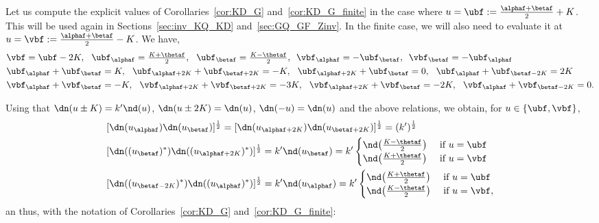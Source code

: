 \documentclass[a4paper,twoside,11pt]{article}
\begin{document}
\begin{exm}\label{ex:KD_u_v_special}
Let us compute the explicit values of Corollaries~\ref{cor:KD_G} and~\ref{cor:KD_G_finite} in the case where
$u=\ubf:=\frac{\alphaf+\betaf}{2}+K$. This will be used again in Sections~\ref{sec:inv_KQ_KD} and~\ref{sec:GQ_GF_Zinv}.
In the finite case, we will also need to evaluate it at $u=\vbf:=\frac{\alphaf+\betaf}{2}-K$. We have,
\begin{align}
&\textstyle \vbf=\ubf-2K,\ \ \ubf_{\alphaf}=\frac{K+\thetaf}{2},\ \ \ubf_{\betaf}=\frac{K-\thetaf}{2},\ \,\vbf_{\alphaf}=-\ubf_{\betaf},\ \,\vbf_{\betaf}
=-\ubf_{\alphaf}\nonumber\\
&\ubf_{\alphaf}+\ubf_{\betaf}=K,\ \ \ubf_{\alphaf+2K}+\ubf_{\betaf+2K}=-K,\ \
\ubf_{\alphaf+2K}+\ubf_{\betaf}=0,\ \ \ubf_{\alphaf}+\ubf_{\betaf-2K}=2K \label{equ:relation_u_v}\\
&\vbf_{\alphaf}+\vbf_{\betaf}=-K,\ \ \vbf_{\alphaf+2K}+\vbf_{\betaf+2K}=-3K,\ \
\vbf_{\alphaf+2K}+\vbf_{\betaf}=-2K,\ \ \vbf_{\alphaf}+\vbf_{\betaf-2K}=0.\nonumber
\end{align}

Using that $\dn(u\pm K)=k'\nd(u)$, $\dn(u\pm 2K)=\dn(u)$, $\dn(-u)=\dn(u)$ and the above relations, we obtain, for $u\in\{\ubf,\vbf\}$,
\begin{align*}
&[\dn(u_{\alphaf})\dn(u_{\betaf})]^\frac{1}{2}=[\dn(u_{\alphaf+2K})\dn(u_{\betaf+2K})]^\frac{1}{2}=(k')^\frac{1}{2}\\
&[\dn((u_{\betaf})^*)\dn((u_{\alphaf+2K})^*)]^\frac{1}{2}=k' \nd(u_{\betaf})=k'
\begin{cases}
\nd\bigl(\frac{K-\thetaf}{2}\bigr)& \text{ if $u=\ubf$} \\
\nd\bigl(\frac{K+\thetaf}{2}\bigr)& \text{ if $u=\vbf$}
\end{cases}\\
&[\dn((u_{\betaf-2K})^*)\dn((u_{\alphaf})^*)]^\frac{1}{2}=k'\nd(u_{\alphaf})=k'
\begin{cases}
\nd\bigl(\frac{K+\thetaf}{2}\bigr)& \text{ if $u=\ubf$} \\
\nd\bigl(\frac{K-\thetaf}{2}\bigr)& \text{ if $u=\vbf$},
\end{cases}
\end{align*}
an thus, with the notation of Corollaries~\ref{cor:KD_G} and~\ref{cor:KD_G_finite}: 


\end{exm}
\end{document}
